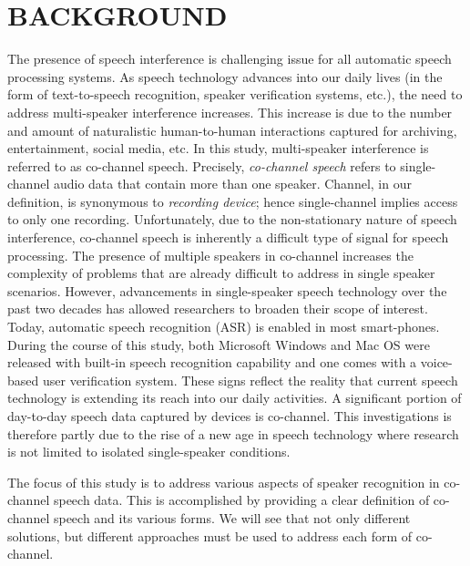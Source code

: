
\chapter{BACKGROUND}
\label{chap:intro}
 
The presence of speech interference is challenging issue for all automatic speech processing systems. 
As speech technology advances into our daily lives (in the form of text-to-speech recognition, speaker verification systems, etc.), the need to address multi-speaker interference increases. 
This increase is due to the number and amount of naturalistic human-to-human interactions captured for archiving, entertainment, social media, etc. 
In this study, multi-speaker interference is referred to as co-channel speech. 
Precisely, {\it co-channel speech} refers to single-channel audio data that contain more than one speaker. 
Channel, in our definition, is synonymous to {\it recording device}; hence single-channel implies access to only one recording. 
Unfortunately, due to the non-stationary nature of speech interference, co-channel speech is inherently a difficult type of signal for speech processing. 
The presence of multiple speakers in co-channel increases the complexity of problems that are already difficult to address in single speaker scenarios. 
However, advancements in single-speaker speech technology over the past two decades has allowed researchers to broaden their scope of interest. 
Today, automatic speech recognition (ASR) is enabled in most smart-phones. 
During the course of this study, both Microsoft Windows and Mac OS were released with built-in speech recognition capability and one comes with a voice-based user verification system. 
These signs reflect the reality that current speech technology is extending its reach into our daily activities. 
A significant portion of day-to-day speech data captured by devices is co-channel. 
This investigations is therefore partly due to the rise of a new age in speech technology where research is not limited to isolated single-speaker conditions. 

The focus of this study is to address various aspects of speaker recognition in co-channel speech data. 
This is accomplished by providing a clear definition of co-channel speech and its various forms. 
We will see that not only different solutions, but different approaches must be used to address each form of co-channel. 






